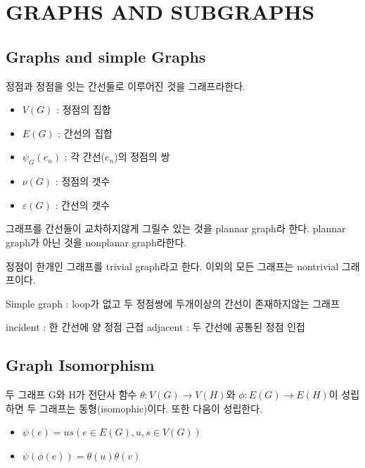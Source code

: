 
\section{GRAPHS AND SUBGRAPHS}
\subsection{Graphs and simple Graphs}

\begin{dfn}[Graph] 정점과 정점을 잇는 간선들로 이루어진 것을 그래프라한다.
    \begin{itemize}
        \item $V(G)$ :  정점의 집합
        \item $E(G)$ :  간선의 집합
        \item $\psi_G(e_n)$ :  각 간선($e_n$)의 정점의 쌍
        \item $\nu(G)$ :  정점의 갯수 
        \item $\varepsilon(G)$ :  간선의 갯수
    \end{itemize}

    
    그래프를 간선들이 교차하지않게 그릴수 있는 것을 plannar graph라 한다. plannar graph가 아닌 것을 nonplanar graph라한다.
    
    정점이 한개인 그래프를 trivial graph라고 한다. 이외의 모든 그래프는 nontrivial 그래프이다.

    Simple graph : loop가 없고 두 정점쌍에 두개이상의 간선이 존재하지않는 그래프

    incident : 한 간선에 양 정점 근접
    adjacent : 두 간선에 공통된 정점 인접

    
\end{dfn}

\subsection{Graph Isomorphism}

\begin{dfn}[isomophic] 두 그래프 G와 H가  전단사 함수 $\theta : V(G) \longrightarrow V(H)$와 $\phi : E(G) \rightarrow E(H)$이 성립하면 두 그래프는 동형(isomophic)이다.
    또한 다음이 성립한다.
\begin{itemize}
    \item $\psi(e) = us( e \in E(G), u,s \in V(G)) $
    \item $\psi(\phi(e)) = \theta(u)\theta(v)$%
\end{itemize}
\end{dfn}

